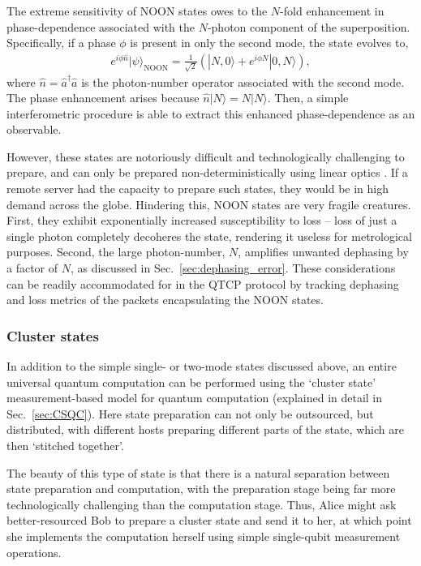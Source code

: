 \documentclass[aps,rmp,twocolumn,amsmath,amssymb,nofootinbib,superscriptaddress,longbibliography,floatfix,table-of-contents,eqsecnum]{revtex4-1}
\newcommand{\ket}[1]{|#1\rangle}
\newcommand{\comment}[1]{{\color{blue}{\textbf{#1}}}}
\begin{document}
The extreme sensitivity of NOON states owes to the $N$-fold enhancement in phase-dependence associated with the $N$-photon component of the superposition. Specifically, if a phase $\phi$ is present in only the second mode, the state evolves to,
\begin{align}
e^{i\phi\hat{n}} \ket\psi_\text{NOON} = \frac{1}{\sqrt{2}}(\ket{N,0}+e^{i\phi N}\ket{0,N}),
\end{align}
where \mbox{$\hat{n}=\hat{a}^\dag\hat{a}$} is the photon-number operator associated with the second mode. The phase enhancement arises because \mbox{$\hat{n}\ket{N}=N\ket{N}$}. Then, a simple interferometric procedure is able to extract this enhanced phase-dependence as an observable.

However, these states are notoriously difficult and technologically challenging to prepare, and can only be prepared non-deterministically using linear optics \cite{bib:Cable07}. If a remote server had the capacity to prepare such states, they would be in high demand across the globe. Hindering this, NOON states are very fragile creatures. First, they exhibit exponentially increased susceptibility to loss -- loss of just a single photon completely decoheres the state, rendering it useless for metrological purposes. Second, the large photon-number, $N$, amplifies unwanted dephasing by a factor of $N$, as discussed in Sec.~\ref{sec:dephasing_error}. These considerations can be readily accommodated for in the QTCP protocol by tracking dephasing and loss metrics of the packets encapsulating the NOON states.

\comment{Talk more about how to make them}

%
%

\subsubsection{Cluster states} 

In addition to the simple single- or two-mode states discussed above, an entire universal quantum computation can be performed using the `cluster state' measurement-based model for quantum computation (explained in detail in Sec.~\ref{sec:CSQC}). Here state preparation can not only be outsourced, but distributed, with different hosts preparing different parts of the state, which are then `stitched together'.

The beauty of this type of state is that there is a natural separation between state preparation and computation, with the preparation stage being far more technologically challenging than the computation stage. Thus, Alice might ask better-resourced Bob to prepare a cluster state and send it to her, at which point she implements the computation herself using simple single-qubit measurement operations.
\end{document}
